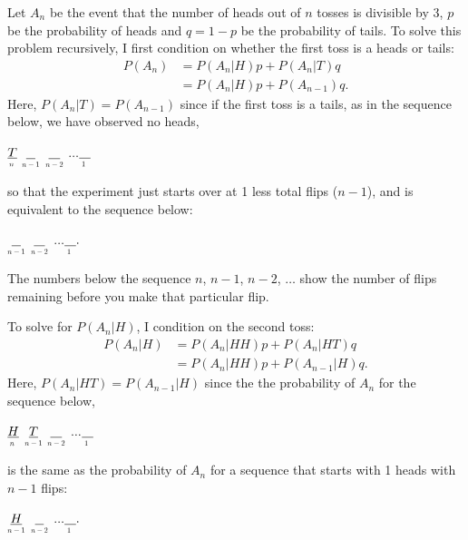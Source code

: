\begin{problem}{4}  Let $A_n$ be the event that the number of heads out of $n$ tosses is divisible by 3, $p$ be the probability of heads and $q=1-p$ be the probability of tails.  To solve this problem recursively, I first condition on whether the first toss is a heads or tails:
\begin{align*}
P(A_n) &= P(A_n|H)p +P(A_n|T)q\\
& = P(A_n|H)p+P(A_{n-1})q.
\end{align*}
Here, $P(A_n|T)=P(A_{n-1})$ since if the first toss is a tails, as in the sequence below, we have observed no heads,  
\begin{center}
$\underset{\scalebox{0.6}{$n$}}{\underline{T}}$ $\underset{\scalebox{0.6}{$n-1$}}{\underline{\phantom T}}$ $\underset{\scalebox{0.6}{$n-2$}}{\underline{\phantom H}}$   $\ldots$$\underset{\scalebox{0.6}{$1$}}{\underline{\phantom H}}$
\end{center}
so that the experiment just starts over at 1 less total flips ($n-1$), and is equivalent to the sequence below:
\begin{center}
$\underset{\scalebox{0.6}{$n-1$}}{\underline{\phantom T}}$ $\underset{\scalebox{0.6}{$n-2$}}{\underline{\phantom H}}$   $\ldots$$\underset{\scalebox{0.6}{$1$}}{\underline{\phantom H}}.$
\end{center}
The numbers below the sequence $n$, $n-1$, $n-2$, $\ldots$ show the number of flips remaining before you make that particular flip.  

To solve for $P(A_n|H)$, I condition on the second toss: 
\begin{align*}
P(A_n|H) &= P(A_n|HH)p+P(A_n|HT)q \\
& = P(A_n|HH)p+P(A_{n-1}|H)q.
\end{align*}
Here, $P(A_n|HT)=P(A_{n-1}|H)$ since the the probability of $A_n$ for the sequence below, 
\begin{center}
$\underset{\scalebox{0.6}{$n$}}{\underline{H}}$ $\underset{\scalebox{0.6}{$n-1$}}{\underline{T}}$ $\underset{\scalebox{0.6}{$n-2$}}{\underline{\phantom H}}$   $\ldots$$\underset{\scalebox{0.6}{$1$}}{\underline{\phantom H}}$
\end{center}
is the same as the probability of $A_n$ for a sequence that starts with 1 heads with $n-1$ flips:
\begin{center}
$\underset{\scalebox{0.6}{$n-1$}}{\underline{H}}$ $\underset{\scalebox{0.6}{$n-2$}}{\underline{\phantom T}}$ $\ldots$$\underset{\scalebox{0.6}{$1$}}{\underline{\phantom H}}.$
\end{center}


\end{problem}
